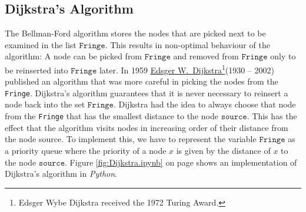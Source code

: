 \subsection{Dijkstra's Algorithm \label{sec:dijkstra}}
The Bellman-Ford algorithm stores the nodes that are picked next to be examined in the list $\texttt{Fringe}$.
This results in non-optimal behaviour of the algorithm:  A node can be picked from $\texttt{Fringe}$ and removed from
$\texttt{Fringe}$ only to be reinserted into $\texttt{Fringe}$ later.  In 1959
\href{https://en.wikipedia.org/wiki/Edsger_W._Dijkstra}{Edsger W.~Dijkstra}\footnote{
  Edsger Wybe Dijkstra received the 1972 Turing Award.}(1930 -- 2002) \cite{dijkstra:59}
published an algorithm that was more careful in picking the nodes from the \texttt{Fringe}.  Dijkstra's algorithm guarantees that it
is never necessary to reinsert a node back into the set $\texttt{Fringe}$.  Dijkstra had the idea to always choose
that node from the \texttt{Fringe} that has the smallest distance to the node $\texttt{source}$.  This has the effect that the algorithm
visits nodes in increasing order of their distance from the node source.  
To implement this, we have to
represent the variable $\texttt{Fringe}$ as a priority queue where the priority of a node $x$ is given by the
distance of $x$ to the node $\texttt{source}$.  Figure \ref{fig:Dijkstra.ipynb} on page
\pageref{fig:Dijkstra.ipynb} shows an implementation of Dijkstra's algorithm in \textsl{Python}.


